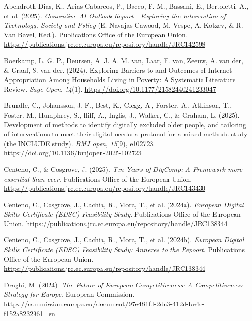 \documentclass[
  dutch,
  letterpaper,
  DIV=11,
  numbers=noendperiod]{scrartcl}
\newlength{\cslhangindent}
\newenvironment{CSLReferences}[2] %
 {\begin{list}{}{%
  \setlength{\itemindent}{0pt}
  \setlength{\leftmargin}{0pt}
  \setlength{\parsep}{0pt}
  \ifodd #1
   \setlength{\leftmargin}{\cslhangindent}
   \setlength{\itemindent}{-1\cslhangindent}
  \fi
  \setlength{\itemsep}{#2\baselineskip}}}
 {\end{list}}
\begin{document}
\label{refs}
\begin{CSLReferences}{1}{0}
Abendroth-Dias, K., Arias-Cabarcos, P., Bacco, F. M., Bassani, E.,
Bertoletti, A., et al. (2025). \emph{Generative {AI} Outlook Report -
Exploring the Intersection of Technology, Society and Policy} (E.
Navajas-Cawood, M. Vespe, A. Kotzev, \& R. Van Bavel, Red.).
Publications Office of the European Union.
\url{https://publications.jrc.ec.europa.eu/repository/handle/JRC142598}

Boerkamp, L. G. P., Deursen, A. J. A. M. van, Laar, E. van, Zeeuw, A.
van der, \& Graaf, S. van der. (2024). Exploring Barriers to and
Outcomes of Internet Appropriation Among Households Living in Poverty: A
Systematic Literature Review. \emph{Sage Open}, \emph{14}(1).
\url{https://doi.org/10.1177/21582440241233047}

Brundle, C., Johansson, J. F., Best, K., Clegg, A., Forster, A.,
Atkinson, T., Foster, M., Humphrey, S., Iliff, A., Inglis, J., Walker,
C., \& Graham, L. (2025). Development of methods to identify digitally
excluded older people, and tailoring of interventions to meet their
digital needs: a protocol for a mixed-methods study (the {INCLUDE}
study). \emph{BMJ open}, \emph{15}(9), e102723.
\url{https://doi.org/10.1136/bmjopen-2025-102723}

Centeno, C., \& Cosgrove, J. (2025). \emph{Ten Years of DigComp: A
Framework more essential than ever}. Publications Office of the European
Union.
\url{https://publications.jrc.ec.europa.eu/repository/handle/JRC143430}

Centeno, C., Cosgrove, J., Cachia, R., Mora, T., et al. (2024a).
\emph{European Digital Skills Certificate ({EDSC}) Feasibility Study}.
Publications Office of the European Union.
\url{https://publications.jrc.ec.europa.eu/repository/handle/JRC138344}

Centeno, C., Cosgrove, J., Cachia, R., Mora, T., et al. (2024b).
\emph{European Digital Skills Certificate ({EDSC}) Feasibility Study:
Annexes to the Repoort}. Publications Office of the European Union.
\url{https://publications.jrc.ec.europa.eu/repository/handle/JRC138344}

Draghi, M. (2024). \emph{The Future of European Competitiveness: A
Competitiveness Strategy for Europe}. European Commission.
\url{https://commission.europa.eu/document/97e481fd-2dc3-412d-be4c-f152a8232961_en}


\end{CSLReferences}
\end{document}
